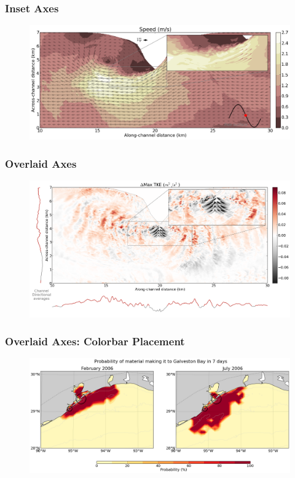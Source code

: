 \documentclass[ignorenonframetext]{beamer}
\begin{document}
\begin{frame}[t]\frametitle{Inset Axes}
	\begin{figure}
		\centering
		\includegraphics[width=\textwidth]{figures/s26inset}
	\end{figure}
\end{frame}


\begin{frame}[t]\frametitle{Overlaid Axes}
	\begin{figure}
		\centering
		\includegraphics[width=\textwidth]{figures/tkemax}
	\end{figure}
\end{frame}


\begin{frame}[t]\frametitle{Overlaid Axes: Colorbar Placement}
	\begin{figure}
		\centering
		\includegraphics[width=\textwidth]{figures/galvestonzoomhistcontour}
	\end{figure}
\end{frame}
\end{document}
